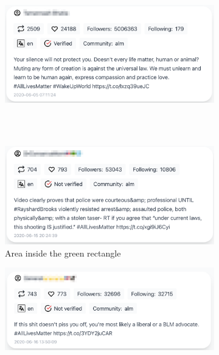 \begin{figure}[H]
\begin{subfigure}{.5\textwidth}
  \centering
  \captionsetup{justification=centering}
  \includegraphics[width=1\linewidth]{Report-latex/tex_files/pics/example/obser4.png}  
  
  \\\
  
  \includegraphics[width=1\linewidth]{Report-latex/tex_files/pics/example/obser5.png} 
 \caption{Area inside the green rectangle}
  \label{fig:sub-third}
\end{subfigure}
\begin{subfigure}{.5\textwidth}
  \centering
  \captionsetup{justification=centering}
  \includegraphics[width=1\linewidth]{Report-latex/tex_files/pics/example/obser6.png}
  

\end{subfigure}
\end{figure}
